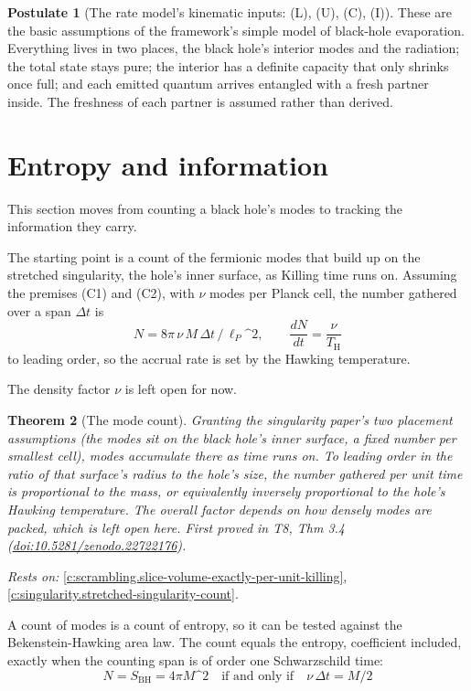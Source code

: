 \documentclass[11pt]{article}
\newtheorem{theorem}{Theorem}[section]
\theoremstyle{definition}
\newtheorem{postulate}[theorem]{Postulate}
\theoremstyle{plain}
\providecommand{\SBH}{}\renewcommand{\SBH}{S_{\mathrm{BH}}}
\providecommand{\TH}{}\renewcommand{\TH}{T_{\mathrm{H}}}
\providecommand{\lP}{}\renewcommand{\lP}{\ell_{P}}
\begin{document}
\begin{postulate}[The rate model's kinematic inputs: (L), (U), (C), (I)]\label{c:singularity.rate-models-kinematic-inputs-l-u}
These are the basic assumptions of the framework's simple model of black-hole evaporation. Everything lives in two places, the black hole's interior modes and the radiation; the total state stays pure; the interior has a definite capacity that only shrinks once full; and each emitted quantum arrives entangled with a fresh partner inside. The freshness of each partner is assumed rather than derived.
\end{postulate}

\section{Entropy and information}

This section moves from counting a black hole's modes to tracking the information they carry.

The starting point is a count of the fermionic modes that build up on the stretched singularity, the hole's inner surface, as Killing time runs on. Assuming the premises (C1) and (C2), with $\nu$ modes per Planck cell, the number gathered over a span $\Delta t$ is \[ N = 8\pi\,\nu\,M\,\Delta t\,/\,\lP\^{}2 , \qquad \frac{dN}{dt} = \frac{\nu}{\TH} \] to leading order, so the accrual rate is set by the Hawking temperature.

The density factor $\nu$ is left open for now.

\begin{theorem}[The mode count]\label{c:scrambling.mode-count}
Granting the singularity paper's two placement assumptions (the modes sit on the black hole's inner surface, a fixed number per smallest cell), modes accumulate there as time runs on. To leading order in the ratio of that surface's radius to the hole's size, the number gathered per unit time is proportional to the mass, or equivalently inversely proportional to the hole's Hawking temperature. The overall factor depends on how densely modes are packed, which is left open here.
\emph{First proved in} T8, Thm 3.4 (\href{https://doi.org/10.5281/zenodo.22722176}{doi:10.5281/zenodo.22722176}).
\end{theorem}
\noindent\emph{Rests on:} \ref{c:scrambling.slice-volume-exactly-per-unit-killing}, \ref{c:singularity.stretched-singularity-count}.

A count of modes is a count of entropy, so it can be tested against the Bekenstein-Hawking area law. The count equals the entropy, coefficient included, exactly when the counting span is of order one Schwarzschild time: \[ N = \SBH = 4\pi M\^{}2 \quad \text{if and only if} \quad \nu\,\Delta t = M/2 \]
\end{document}
